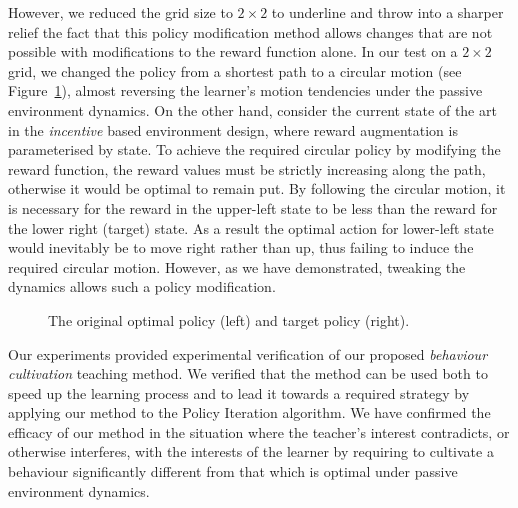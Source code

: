 However, we reduced the grid size to $2\times 2$ to underline and throw
into a sharper relief the fact that this policy modification method
allows changes that are not possible with modifications to the reward
function alone. In our test on a $2 \times 2$ grid, we changed the
policy from a shortest path to a circular motion (see
Figure~\ref{envdopt}), almost reversing the learner's motion
tendencies under the passive environment dynamics. On the other hand,
consider the current state of the art in the {\em incentive} based
environment design, where reward augmentation is parameterised by
state. To achieve the required circular policy by modifying the reward
function, the reward values must be strictly increasing along the
path, otherwise it would be optimal to remain put. By following the
circular motion, it is necessary for the reward in the upper-left
state to be less than the reward for the lower right (target)
state. As a result the optimal action for lower-left state would
inevitably be to move right rather than up, thus failing to induce the
required circular motion. However, as we have demonstrated, tweaking
the dynamics allows such a policy modification.

\begin{figure}[ht]
\centerline{}
\caption{\label{envdopt}The original optimal policy (left) and target policy (right).}
\end{figure}

Our experiments provided experimental verification of our proposed
{\em behaviour cultivation} teaching method.  We verified that the
method can be used both to speed up the learning process and to lead
it towards a required strategy by applying our method to the Policy
Iteration algorithm. We have confirmed the efficacy of our method in
the situation where the teacher's interest contradicts, or otherwise
interferes, with the interests of the learner by requiring to
cultivate a behaviour significantly different from that which is
optimal under passive environment dynamics.
